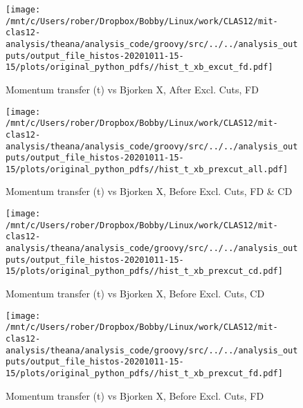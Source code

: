 \documentclass{article}
\begin{document}
\begin{landscape}
    \begin{figure}[h]
        \centering

        \texttt{[image: /mnt/c/Users/rober/Dropbox/Bobby/Linux/work/CLAS12/mit-clas12-analysis/theana/analysis\_code/groovy/src/../../analysis\_outputs/output\_file\_histos-20201011-15-15/plots/original\_python\_pdfs//hist\_t\_xb\_excut\_fd.pdf]}
        \captionsetup{textformat=empty,labelformat=blank}
        \caption{Momentum transfer (t) vs Bjorken X, After Excl. Cuts, FD}
    \end{figure}
    \clearpage
    
    \begin{figure}[h]
        \centering

        \texttt{[image: /mnt/c/Users/rober/Dropbox/Bobby/Linux/work/CLAS12/mit-clas12-analysis/theana/analysis\_code/groovy/src/../../analysis\_outputs/output\_file\_histos-20201011-15-15/plots/original\_python\_pdfs//hist\_t\_xb\_prexcut\_all.pdf]}
        \captionsetup{textformat=empty,labelformat=blank}
        \caption{Momentum transfer (t) vs Bjorken X, Before Excl. Cuts, FD \& CD}
    \end{figure}
    \clearpage
    
    \begin{figure}[h]
        \centering

        \texttt{[image: /mnt/c/Users/rober/Dropbox/Bobby/Linux/work/CLAS12/mit-clas12-analysis/theana/analysis\_code/groovy/src/../../analysis\_outputs/output\_file\_histos-20201011-15-15/plots/original\_python\_pdfs//hist\_t\_xb\_prexcut\_cd.pdf]}
        \captionsetup{textformat=empty,labelformat=blank}
        \caption{Momentum transfer (t) vs Bjorken X, Before Excl. Cuts, CD}
    \end{figure}
    \clearpage
    
    \begin{figure}[h]
        \centering

        \texttt{[image: /mnt/c/Users/rober/Dropbox/Bobby/Linux/work/CLAS12/mit-clas12-analysis/theana/analysis\_code/groovy/src/../../analysis\_outputs/output\_file\_histos-20201011-15-15/plots/original\_python\_pdfs//hist\_t\_xb\_prexcut\_fd.pdf]}
        \captionsetup{textformat=empty,labelformat=blank}
        \caption{Momentum transfer (t) vs Bjorken X, Before Excl. Cuts, FD}
    \end{figure}
    \clearpage
    
    \begin{figure}[h]
        \centering


\end{figure}
\end{landscape}
\end{document}
